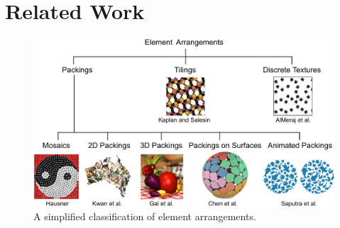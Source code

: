 
\chapter{Related Work}
\label{chapter_related_work}

\begin{figure}[t]
\centering
\includegraphics[width=1.0\textwidth]{figures/related/taxonomy.pdf} 
\caption[A classification of element arrangements]
{\label{fig_taxonomy} 
\nnewtext
{
A simplified classification of element arrangements.
}
}
\end{figure}


